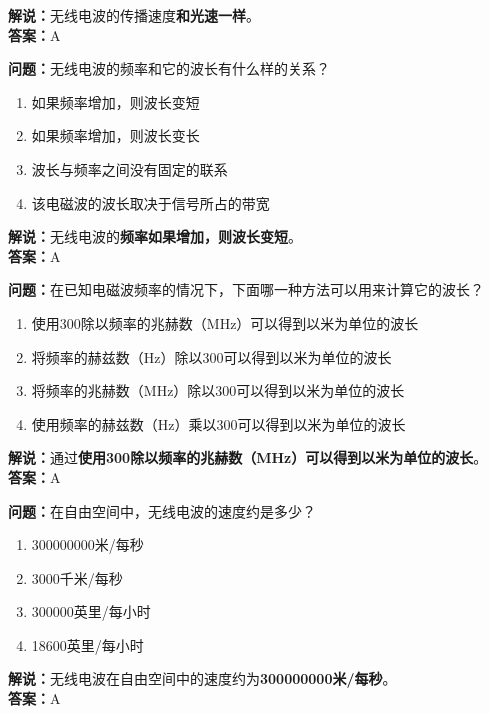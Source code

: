 \textbf{解说：}无线电波的传播速度\textbf{和光速一样}。\\\textbf{答案：}A



\textbf{问题：}无线电波的频率和它的波长有什么样的关系？

\begin{enumerate}[label=\Alph*), leftmargin=1cm]
	\item 如果频率增加，则波长变短
	\item 如果频率增加，则波长变长
	\item 波长与频率之间没有固定的联系
	\item 该电磁波的波长取决于信号所占的带宽
\end{enumerate}

\textbf{解说：}无线电波的\textbf{频率如果增加，则波长变短}。\\\textbf{答案：}A



\textbf{问题：}在已知电磁波频率的情况下，下面哪一种方法可以用来计算它的波长？

\begin{enumerate}[label=\Alph*), leftmargin=1cm]
	\item 使用300除以频率的兆赫数（MHz）可以得到以米为单位的波长
	\item 将频率的赫兹数（Hz）除以300可以得到以米为单位的波长
	\item 将频率的兆赫数（MHz）除以300可以得到以米为单位的波长
	\item 使用频率的赫兹数（Hz）乘以300可以得到以米为单位的波长
\end{enumerate}

\textbf{解说：}通过\textbf{使用300除以频率的兆赫数（MHz）可以得到以米为单位的波长}。\\\textbf{答案：}A



\textbf{问题：}在自由空间中，无线电波的速度约是多少？

\begin{enumerate}[label=\Alph*), leftmargin=1cm]
	\item 300000000米/每秒
	\item 3000千米/每秒
	\item 300000英里/每小时
	\item 18600英里/每小时
\end{enumerate}

\textbf{解说：}无线电波在自由空间中的速度约为\textbf{300000000米/每秒}。\\\textbf{答案：}A




